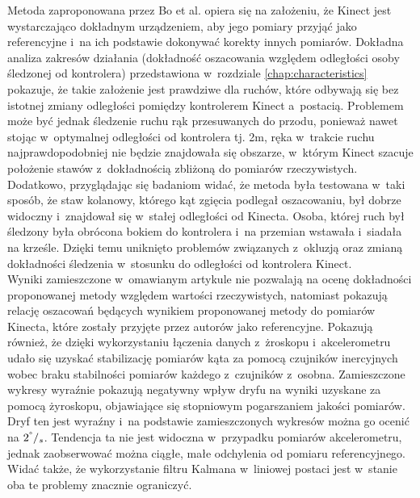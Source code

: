 Metoda zaproponowana przez Bo et al. opiera się na założeniu, że Kinect jest wystarczająco dokładnym urządzeniem, aby jego pomiary przyjąć jako referencyjne i~na ich podstawie dokonywać korekty innych pomiarów. Dokładna analiza zakresów działania (dokładność oszacowania względem odległości osoby śledzonej od kontrolera) przedstawiona w~rozdziale \ref{chap:characteristics} pokazuje, że takie założenie jest prawdziwe dla ruchów, które odbywają się bez istotnej zmiany odległości pomiędzy kontrolerem Kinect a~postacią. Problemem może być jednak śledzenie ruchu rąk przesuwanych do przodu, ponieważ nawet stojąc w~optymalnej odległości od kontrolera tj. 2m, ręka w~trakcie ruchu najprawdopodobniej nie będzie znajdowała się obszarze, w~którym Kinect szacuje położenie stawów z~dokładnością zbliżoną do pomiarów rzeczywistych. Dodatkowo, przyglądając się badaniom widać, że metoda była testowana w~taki sposób, że staw kolanowy, którego kąt zgięcia podlegał oszacowaniu, był dobrze widoczny i~znajdował się w~stałej odległości od Kinecta. Osoba, której ruch był śledzony była obrócona bokiem do kontrolera i~na przemian wstawała i~siadała na krześle. Dzięki temu uniknięto problemów związanych z~okluzją oraz zmianą dokładności śledzenia w~stosunku do odległości od kontrolera Kinect.\\
																																																	
Wyniki zamieszczone w~omawianym artykule \cite{Bo2011a} nie pozwalają na ocenę dokładności proponowanej metody względem wartości rzeczywistych, natomiast pokazują relację oszacowań będących wynikiem proponowanej metody do pomiarów Kinecta, które zostały przyjęte przez autorów jako referencyjne. Pokazują również, że dzięki wykorzystaniu łączenia danych z~żroskopu i~akcelerometru udało się uzyskać stabilizację pomiarów kąta za pomocą czujników inercyjnych wobec braku stabilności pomiarów każdego z~czujników z~osobna. Zamieszczone wykresy wyraźnie pokazują negatywny wpływ dryfu na wyniki uzyskane za pomocą żyroskopu, objawiające się stopniowym pogarszaniem jakości pomiarów. Dryf ten jest wyraźny i~na podstawie zamieszczonych wykresów można go ocenić na $2^\degree/_s$. Tendencja ta nie jest widoczna w~przypadku pomiarów akcelerometru, jednak zaobserwować można ciągłe, małe odchylenia od pomiaru referencyjnego. Widać także, że wykorzystanie filtru Kalmana w~liniowej postaci jest w~stanie oba te problemy znacznie ograniczyć.\\
																																																	
